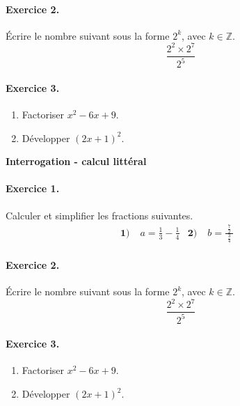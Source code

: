 \documentclass[11pt]{article}
\begin{document}
\paragraph{Exercice 2.} Écrire le nombre suivant sous la forme $2^k$, avec
$k\in\mathbb{Z}$.
\[
  \frac{2^2\times2^7}{2^5}
\]
\paragraph{Exercice 3.}
\begin{enumerate}
  \item Factoriser $x^2-6x+9$.
  \item Développer $(2x+1)^2$.
\end{enumerate}

\vspace{2cm}

\begin{center}
  \textbf{\LARGE Interrogation - calcul littéral}
\end{center}

\paragraph{Exercice 1.} Calculer et simplifier les fractions suivantes.
\begin{align*}
  \textbf{1)}\;& a = \frac{1}{3}-\frac{1}{4} &
  \textbf{2)}\;& b = \frac{\;\frac{7}{2}\;}{\frac{3}{4}} &
\end{align*}

\paragraph{Exercice 2.} Écrire le nombre suivant sous la forme $2^k$, avec
$k\in\mathbb{Z}$.
\[
  \frac{2^2\times2^7}{2^5}
\]
\paragraph{Exercice 3.}
\begin{enumerate}
  \item Factoriser $x^2-6x+9$.
  \item Développer $(2x+1)^2$.
\end{enumerate}
\end{document}
